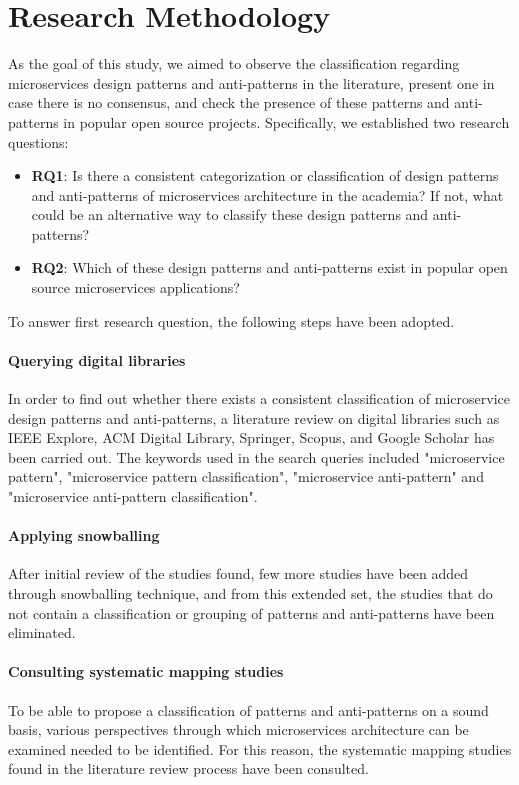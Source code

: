 \documentclass[11pt,a4paper,twocolumn]{article}
\begin{document}
\section{Research Methodology}
\label{sec:research_method}

As the goal of this study, we aimed to observe the classification regarding microservices design patterns and anti-patterns in the literature, present one in case there is no consensus, and check the presence of these patterns and anti-patterns in popular open source projects.
Specifically, we established two research questions:
\begin{itemize}
    \item \textbf{RQ1}: Is there a consistent categorization or classification of design patterns and anti-patterns of microservices architecture in the academia?
    If not, what could be an alternative way to classify these design patterns and anti-patterns?
    
    \item \textbf{RQ2}: Which of these design patterns and anti-patterns exist in popular open source microservices applications?
\end{itemize}

To answer first research question, the following steps have been adopted.

\paragraph{Querying digital libraries}
In order to find out whether there exists a consistent classification of microservice design patterns and anti-patterns, a literature review on digital libraries such as IEEE Explore, ACM Digital Library, Springer, Scopus, and Google Scholar has been carried out.
The keywords used in the search queries included "microservice pattern", "microservice pattern classification", "microservice anti-pattern" and "microservice anti-pattern classification".

\paragraph{Applying snowballing}
After initial review of the studies found, few more studies have been added through snowballing technique, and from this extended set, the studies that do not contain a classification or grouping of patterns and anti-patterns have been eliminated.

\paragraph{Consulting systematic mapping studies}
To be able to propose a classification of patterns and anti-patterns on a sound basis, various perspectives through which microservices architecture can be examined needed to be identified.
For this reason, the systematic mapping studies found in the literature review process have been consulted.
\end{document}
